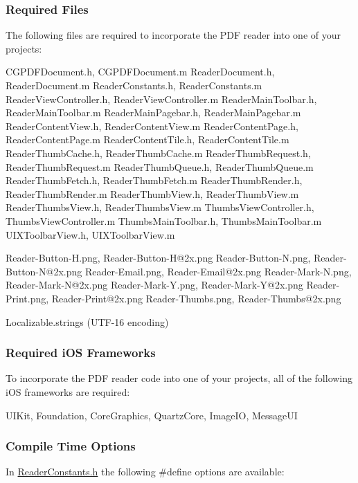 \subsubsection*{Required Files}

The following files are required to incorporate the P\-D\-F reader into one of your projects\-: \begin{DoxyVerb}CGPDFDocument.h, CGPDFDocument.m
ReaderDocument.h, ReaderDocument.m
ReaderConstants.h, ReaderConstants.m
ReaderViewController.h, ReaderViewController.m
ReaderMainToolbar.h, ReaderMainToolbar.m
ReaderMainPagebar.h, ReaderMainPagebar.m
ReaderContentView.h, ReaderContentView.m
ReaderContentPage.h, ReaderContentPage.m
ReaderContentTile.h, ReaderContentTile.m
ReaderThumbCache.h, ReaderThumbCache.m
ReaderThumbRequest.h, ReaderThumbRequest.m
ReaderThumbQueue.h, ReaderThumbQueue.m
ReaderThumbFetch.h, ReaderThumbFetch.m
ReaderThumbRender.h, ReaderThumbRender.m
ReaderThumbView.h, ReaderThumbView.m
ReaderThumbsView.h, ReaderThumbsView.m
ThumbsViewController.h, ThumbsViewController.m
ThumbsMainToolbar.h, ThumbsMainToolbar.m
UIXToolbarView.h, UIXToolbarView.m

Reader-Button-H.png, Reader-Button-H@2x.png
Reader-Button-N.png, Reader-Button-N@2x.png
Reader-Email.png, Reader-Email@2x.png
Reader-Mark-N.png, Reader-Mark-N@2x.png
Reader-Mark-Y.png, Reader-Mark-Y@2x.png
Reader-Print.png, Reader-Print@2x.png
Reader-Thumbs.png, Reader-Thumbs@2x.png

Localizable.strings (UTF-16 encoding)
\end{DoxyVerb}


\subsubsection*{Required i\-O\-S Frameworks}

To incorporate the P\-D\-F reader code into one of your projects, all of the following i\-O\-S frameworks are required\-: \begin{DoxyVerb}UIKit, Foundation, CoreGraphics, QuartzCore, ImageIO, MessageUI
\end{DoxyVerb}


\subsubsection*{Compile Time Options}

In \hyperlink{_reader_constants_8h}{Reader\-Constants.\-h} the following \#define options are available\-:

